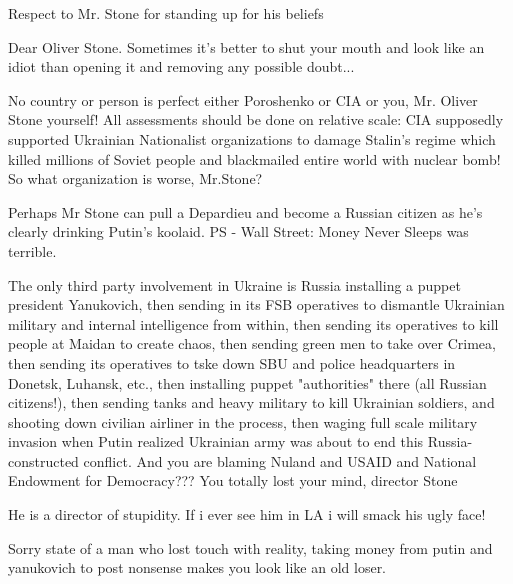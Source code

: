 \begin{itemize}

Respect to Mr. Stone for standing up for his beliefs


Dear Oliver Stone. Sometimes it's better to shut your mouth and look like an
idiot than opening it and removing any possible doubt...


No country or person is perfect either Poroshenko or CIA or you, Mr. Oliver
Stone yourself! All assessments should be done on relative scale: CIA
supposedly supported Ukrainian Nationalist organizations to damage Stalin's
regime which killed millions of Soviet people and blackmailed entire world with
nuclear bomb! So what organization is worse, Mr.Stone?


Perhaps Mr Stone can pull a Depardieu and become a Russian citizen as he's
clearly drinking Putin's koolaid. PS - Wall Street: Money Never Sleeps was
terrible.


The only third party involvement in Ukraine is Russia installing a puppet
president Yanukovich, then sending in its FSB operatives to dismantle Ukrainian
military and internal intelligence from within, then sending its operatives to
kill people at Maidan to create chaos, then sending green men to take over
Crimea, then sending its operatives to tske down SBU and police headquarters in
Donetsk, Luhansk, etc., then installing puppet "authorities" there (all Russian
citizens!), then sending tanks and heavy military to kill Ukrainian soldiers,
and shooting down civilian airliner in the process, then waging full scale
military invasion when Putin realized Ukrainian army was about to end this
Russia-constructed conflict. And you are blaming Nuland and USAID and National
Endowment for Democracy??? You totally lost your mind, director Stone

\begin{itemize} %
He is a director of stupidity. If i ever see him in LA i will smack his ugly face!
\end{itemize} %


Sorry state of a man who lost touch with reality, taking money from putin and
yanukovich to post nonsense makes you look like an old loser.




\end{itemize}
